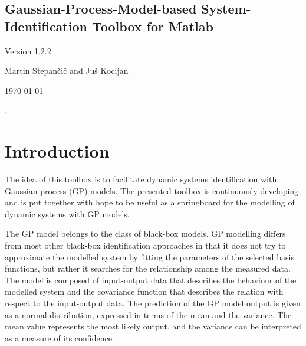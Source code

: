 \documentclass[12pt,twoside]{article}
\begin{document}
\thispagestyle{empty}
\vspace{3cm}

\vspace{4cm}
\begin{center}
\section*{Gaussian-Process-Model-based System-Identification Toolbox for Matlab}
\end{center}
\begin{center}
\Large Version 1.2.2
\end{center}
 \vspace{3mm}
\vspace{3cm}
\begin{center}{\Large Martin Stepan\v ci\v c and Ju\v s Kocijan} \end{center}

  \vfill \centerline{\Large \today}
\pagebreak\setcounter{page}{1}
\newpage


\newpage
\thispagestyle{empty} .\newpage {}
\setcounter{page}{1}

\section{Introduction}

The idea of this toolbox is to facilitate dynamic systems
identification with Gaussian-process (GP) models. The presented toolbox is continuously developing and is put together with hope to be useful
as a springboard for the modelling of dynamic systems with GP models.

The GP model belongs to the class of black-box models. GP modelling
differs from most other black-box identification approaches in that it does
not try to approximate the modelled system by fitting the parameters of the
selected basis functions, but rather it searches for the relationship among the measured data. The model is composed of input-output data that describes
the behaviour of the modelled system and the covariance function that describes the relation with respect to the input-output data. The prediction of
the GP model output is given as a normal distribution, expressed in terms
of the mean and the variance. The mean value represents the most likely
output, and the variance can be interpreted as a measure of its confidence.
\end{document}
